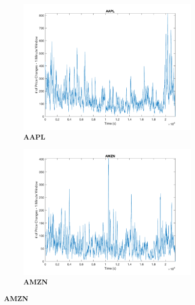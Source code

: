 \begin{figure}[htbp]

\centering
\begin{subfigure}[t]{0.49\textwidth}
\captionsetup{labelformat=empty}

\caption{\textbf{AAPL}}
\includegraphics[width=\textwidth, trim = 0 0 0 30, clip]{Cluster_Plots/AAPL_cluster.png}

\end{subfigure}
\begin{subfigure}[t]{0.49\textwidth}
\captionsetup{labelformat=empty}

\caption{\textbf{AMZN}}
\includegraphics[width=\textwidth, trim = 0 0 0 30, clip]{Cluster_Plots/AMZN_cluster.png}
\end{subfigure}


\end{figure}
